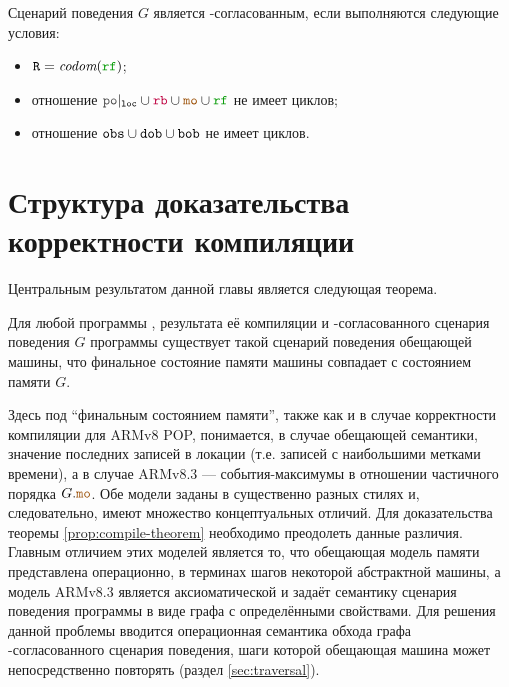 \begin{definition}
Сценарий поведения $G$ является \ARM-согласованным, если выполняются следующие условия:
\begin{itemize}
\item $\lR = \codom{\lRF}$; 
\item отношение $\lPO\rst{\lLOC} \cup \lFR \cup \lCO \cup \lRF$ не имеет циклов; 
\item отношение ${\mathtt{obs}} \cup {\mathtt{dob}} \cup {\mathtt{bob}}$ не имеет циклов. 
\end{itemize}
\end{definition}
\section{Структура доказательства корректности компиляции}
\label{sec:highlevel}
Центральным результатом данной главы является следующая теорема. 
\begin{theorem}
  \label{prop:compile-theorem}
  Для любой программы \Prog, результата её компиляции \ProgARM и \ARM-согласованного
  сценария поведения $G$ программы
  \ProgARM существует такой сценарий поведения обещающей машины, что
  финальное состояние памяти машины совпадает с состоянием памяти $G$.
\end{theorem}
\noindent
Здесь под ``финальным состоянием памяти'', также как и в случае корректности компиляции для
ARMv8 POP, понимается, в случае обещающей семантики, значение последних записей в локации (т.е. записей с наибольшими
метками времени), а в случае ARMv8.3 --- события-максимумы в отношении частичного порядка $G.\lCO$. Обе модели заданы в существенно разных стилях
и, следовательно, имеют множество концептуальных отличий. Для доказательства теоремы \ref{prop:compile-theorem} необходимо преодолеть данные различия.
Главным отличием этих моделей является то, что обещающая модель памяти представлена операционно, в терминах
шагов некоторой абстрактной машины, а модель ARMv8.3 является аксиоматической и задаёт семантику 
сценария поведения программы в виде графа с определёнными свойствами. 
Для решения данной проблемы вводится операционная семантика обхода графа \ARM-согласованного
сценария поведения,
шаги которой обещающая машина может непосредственно повторять (раздел \ref{sec:traversal}).
